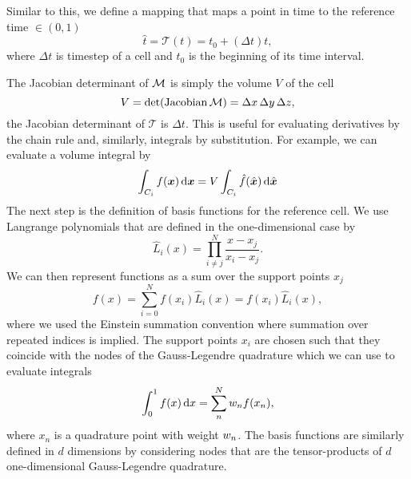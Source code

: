 Similar to this, we define a mapping that maps a point in time to the reference time $\in (0,1)$
\newcommand{\timeMapping}{\mathcal{T}}
\begin{equation}
  \label{eq:time-mapping}
  \hat{t} = \timeMapping(t) = t_0 + (\Delta t) t,
\end{equation}
where $\Delta t$ is timestep of a cell and $t_0$ is the beginning of its time interval.

The Jacobian determinant of $\mapping$ is simply the volume $V$ of the cell
\begin{equation}
  \label{eq:determinant-mapping}
  \volume = \operatorname{det}(\operatorname{Jacobian}\mapping) = \Delta x \, \Delta y \,\Delta z,
\end{equation}
the Jacobian determinant of $\timeMapping$ is $\Delta t$.
This is useful for evaluating derivatives by the chain rule and, similarly, integrals by substitution.
For example, we can evaluate a volume integral by
\begin{equation}
  \label{eq:integration-by-substitution}
  \intdcell{
f(\bm{x})
  }
  =
\volume \intdrefcell{
    \hat{f}(\hat{\bm{x}})
  }
\end{equation}
\newcommand{\lagrangeRef}[1][i]{\hat{L}_{#1}}
\newcommand{\lagrange}[1][i]{L_{#1}}
The next step is the definition of basis functions for the reference cell.
We use Langrange polynomials that are defined in the one-dimensional case by
\begin{equation}
  \label{eq:lagrange-basis}
  \lagrangeRef(x) = \prod_{i \neq j}^N \frac{x - x_j}{x_i - x_j}.
\end{equation}
We can then represent functions as a sum over the support points $x_j$
\begin{equation}
  \label{eq:langrange-expansion-1d}
  f(x) = \sum_{i = 0}^N f(x_i) \lagrangeRef[i](x) = f(x_i) \lagrangeRef[i](x),
\end{equation}
where we used the Einstein summation convention where summation over repeated indices is implied.
The support points $x_i$ are chosen such that they coincide with the nodes of the Gauss-Legendre quadrature which we can use to evaluate integrals
\begin{equation}
  \label{eq:quadrature-1d}
  \int_0^1 f(x) \dd{x} = \sum_n^N \quadWeight[n] f(x_n),
\end{equation}
where $x_n$ is a quadrature point with weight $\quadWeight[n]$.
The basis functions are similarly defined in $d$ dimensions by considering nodes that are the tensor-products of $d$ one-dimensional Gauss-Legendre quadrature.
